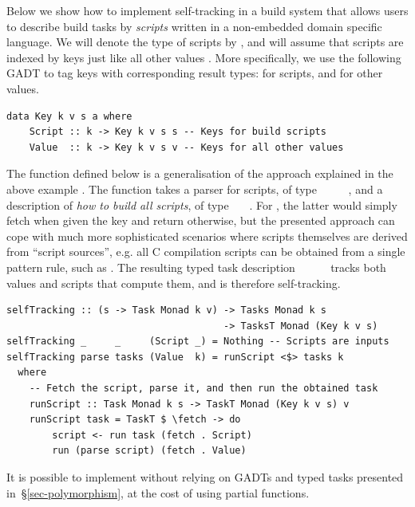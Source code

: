 Below we show how to implement self-tracking in a build system that allows users
to describe build tasks by \emph{scripts} written in a non-embedded domain
specific language. We will denote the type of scripts by , and will assume
that scripts are indexed by keys  just like all other values . More
specifically, we use the following GADT to tag keys  with corresponding
result types:  for scripts, and  for other values.

\vspace{1mm}
\begin{verbatim}
data Key k v s a where
    Script :: k -> Key k v s s -- Keys for build scripts
    Value  :: k -> Key k v s v -- Keys for all other values
\end{verbatim}
\vspace{1mm}

\noindent
The function  defined below is a generalisation of the approach
explained in the above \Excel example . The function takes a parser
for scripts, of type ~\hs{->}~~~~, and a
description of \emph{how to build all scripts}, of type
~~~. For , the latter would simply
fetch  when given the key  and return 
otherwise, but the presented approach can cope with much more sophisticated
scenarios where scripts themselves are derived from ``script sources'', e.g. all
C compilation scripts can be obtained from a single pattern rule, such as
. The resulting typed task description
~~~~~ tracks both values and
scripts that compute them, and is therefore self-tracking.

\vspace{1mm}
\begin{verbatim}
selfTracking :: (s -> Task Monad k v) -> Tasks Monad k s
                                      -> TasksT Monad (Key k v s)
selfTracking _     _     (Script _) = Nothing -- Scripts are inputs
selfTracking parse tasks (Value  k) = runScript <$> tasks k
  where
    -- Fetch the script, parse it, and then run the obtained task
    runScript :: Task Monad k s -> TaskT Monad (Key k v s) v
    runScript task = TaskT $ \fetch -> do
        script <- run task (fetch . Script)
        run (parse script) (fetch . Value)
\end{verbatim}
\vspace{1mm}

\noindent
It is possible to implement  without relying on GADTs and typed
tasks presented in~\S\ref{sec-polymorphism}, at the cost of using partial
functions.
